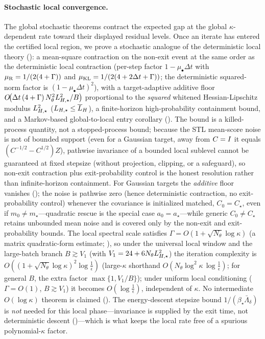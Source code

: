 \paragraph{Stochastic local convergence.}
The global stochastic theorems contract the expected gap at the global $\kappa$-dependent rate toward
their displayed residual levels. Once an iterate has
entered the certified local region, we prove a stochastic analogue of the deterministic local theory
(): a mean-square contraction on the non-exit event at the same order as the
deterministic local contraction (per-step factor $1-\mu_\bullet\Delta t$ with
$\mu_{\mathrm{R}}=1/(2(4+\Gamma))$ and $\mu_{\mathrm{KL}}=1/(2(4+2\Delta t+\Gamma))$; the deterministic squared-norm factor is $(1-\mu_\bullet\Delta t)^2$), with a
target-adaptive additive floor $O\!\bigl(\Delta t\,(4+\Gamma)\,N_\theta^2L_{H,\star}^2/B\bigr)$
proportional to the \emph{squared} whitened Hessian-Lipschitz modulus $L_{H,\star}^2$ ($L_{H,\star}\leq\overline{L}_H$), a finite-horizon
high-probability containment bound, and a Markov-based global-to-local entry corollary
(). The bound is a killed-process quantity, not a stopped-process bound;
because the STL mean-score noise is not of bounded support (even for a Gaussian target, away from
$C=I$ it equals $(C^{-1/2}-C^{1/2})Z$), pathwise invariance of a bounded local sublevel cannot be
guaranteed at fixed stepsize (without projection, clipping, or a safeguard), so non-exit contraction
plus exit-probability control is the honest resolution rather than infinite-horizon containment. For Gaussian targets the \emph{additive} floor vanishes
(); the noise is pathwise zero (hence deterministic contraction, no
exit-probability control) whenever the covariance is initialized matched, $C_0=C_\star$, even if
$m_0\neq m_\star$---quadratic rescue is the special case $a_0=a_\star$---while generic $C_0\neq C_\star$
retains unbounded mean noise and is covered only by the non-exit and exit-probability bounds. The
local spectral scale satisfies $\Gamma=O(1+\sqrt{N_\theta}\log\kappa)$ (a matrix quadratic-form
estimate; ), so under the universal local window and the large-batch
branch $B\gtrsim V_1$ (with $V_1=24+6N_\theta L_{H,\star}^2$) the iteration complexity is
$O((1+\sqrt{N_\theta}\log\kappa)^2\log\tfrac1\epsilon)$
(large-$\kappa$ shorthand $O(N_\theta\log^2\kappa\,\log\tfrac1\epsilon)$; for general $B$, the extra
factor $\max\{1,V_1/B\}$); under uniform local
conditioning ($\Gamma=O(1)$, $B\gtrsim V_1$) it becomes $O(\log\tfrac1\epsilon)$, independent of
$\kappa$. No intermediate $O(\log\kappa)$ theorem is claimed (). The
energy-descent stepsize bound $1/(\beta_\star\bar\Lambda_\delta)$ is \emph{not} needed for this local
phase---invariance is supplied by the exit time, not deterministic descent
()---which is what keeps the local rate free of a spurious
polynomial-$\kappa$ factor.

